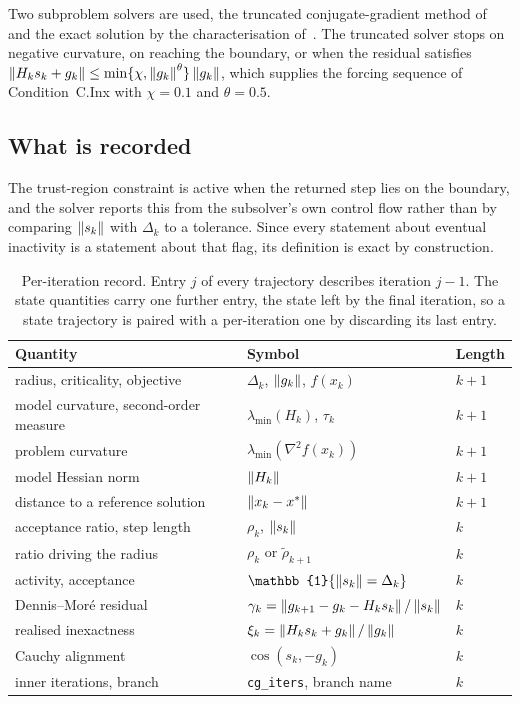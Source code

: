 \documentclass[11pt]{article}
\theoremstyle{plain}
\theoremstyle{definition}
\theoremstyle{remark}
\numberwithin{equation}{section}
\begin{document}
Two subproblem solvers are used, the truncated conjugate-gradient method
of~\citet{Steihaug83, Toint81} and the exact solution by the characterisation
of~\citet{MoreSorensen83}. The truncated solver stops on negative curvature, on
reaching the boundary, or when the residual satisfies
$\left \lVert H_ks_k + g_k \right \rVert \leq \min\{\chi, \left \lVert g_k \right \rVert^{\theta}\}\left \lVert g_k \right \rVert$, which
supplies the forcing sequence of Condition~C.Inx with $\chi = 0.1$ and
$\theta = 0.5$.

\subsection{What is recorded}
\label{sec: what is recorded}

The trust-region constraint is active when the returned step lies on the
boundary, and the solver reports this from the subsolver's own control flow
rather than by comparing $\left \lVert s_k \right \rVert$ with $\Delta_k$ to a tolerance. Since every
statement about eventual inactivity is a statement about that flag, its
definition is exact by construction.

\begin{table}[htbp]
  \centering
  \caption{Per-iteration record. Entry $j$ of every trajectory describes
           iteration $j-1$. The state quantities carry one further entry, the
           state left by the final iteration, so a state trajectory is paired
           with a per-iteration one by discarding its last entry.}
  \label{tab: trace}
  \small
  \begin{tabular}{@{}lll@{}}
    \toprule
    Quantity & Symbol & Length \\
    \midrule
    radius, criticality, objective & $\Delta_k$, $\left \lVert g_k \right \rVert$, $f(x_k)$ & $k+1$ \\
    model curvature, second-order measure & $\lambda_{\min}(H_k)$, $\tau_k$ & $k+1$ \\
    problem curvature & $\lambda_{\min}(\nabla^2 f(x_k))$ & $k+1$ \\
    model Hessian norm & $\left \lVert H_k \right \rVert$ & $k+1$ \\
    distance to a reference solution & $\left \lVert x_k - x^* \right \rVert$ & $k+1$ \\
    \midrule
    acceptance ratio, step length & $\rho_k$, $\left \lVert s_k \right \rVert$ & $k$ \\
    ratio driving the radius & $\rho_k$ or $\widetilde\rho_{k+1}$ & $k$ \\
    activity, acceptance & $\mathbb{1}\{\norm{s_k} = \Delta_k\}$ & $k$ \\
    Dennis--Mor\'e residual & $\gamma_k = \left \lVert g_{k+1} - g_k - H_ks_k \right \rVert/\left \lVert s_k \right \rVert$ & $k$ \\
    realised inexactness & $\xi_k = \left \lVert H_ks_k + g_k \right \rVert/\left \lVert g_k \right \rVert$ & $k$ \\
    Cauchy alignment & $\cos(s_k, -g_k)$ & $k$ \\
    inner iterations, branch & \texttt{cg\_iters}, branch name & $k$ \\
    \bottomrule
  \end{tabular}
\end{table}
\end{document}
